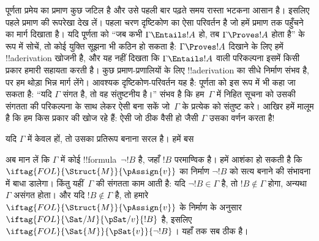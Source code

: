 \documentclass[../../../include/open-logic-section]{subfiles}
\begin{document}
      {}
      {}


पूर्णता प्रमेय का प्रमाण कुछ जटिल है और उसे पहली बार पढ़ते समय रास्ता भटकना
आसान है। इसलिए पहले प्रमाण की रूपरेखा देख लें। पहला चरण दृष्टिकोण का ऐसा
परिवर्तन है जो हमें प्रमाण तक पहुँचने का मार्ग दिखाता है। यदि पूर्णता को
``जब कभी $\Gamma
\Entails !A$ हो, तब $\Gamma \Proves !A$ होता है'' के रूप में सोचें, तो कोई
युक्ति सूझना भी कठिन हो सकता है: $\Gamma \Proves !A$ दिखाने के लिए हमें
!!a{derivation} खोजनी है, और यह नहीं दिखता कि $\Gamma \Entails !A$ वाली
परिकल्पना इसमें किसी प्रकार हमारी सहायता करती है। कुछ प्रमाण-प्रणालियों के
लिए !!a{derivation} का सीधे निर्माण संभव है, पर हम थोड़ा भिन्न मार्ग लेंगे।
आवश्यक दृष्टिकोण-परिवर्तन यह है: पूर्णता को इस रूप में भी कहा जा सकता है:
``यदि $\Gamma$ संगत है, तो वह संतुष्टनीय है।'' संभव है कि हम~$\Gamma$ में
निहित सूचना को उसकी संगतता की परिकल्पना के साथ लेकर ऐसी
 बना सकें जो~$\Gamma$ के प्रत्येक
 को संतुष्ट करे। आखिर हमें मालूम है कि
हम किस प्रकार की  खोज रहे हैं: ऐसी
जो ठीक वैसी हो जैसी $\Gamma$ उसका वर्णन करता है!{}

यदि $\Gamma$ में केवल  हों, तो उसका प्रतिरूप बनाना
सरल है। हमें बस

अब मान लें कि $\Gamma$ में कोई !!{formula}~$\lnot !B$ है, जहाँ $!B$
परमाण्विक है। हमें आशंका हो सकती है कि
$\iftag{FOL}{\Struct{M}}{\pAssign{v}}$ का निर्माण $\lnot !B$ को सत्य बनाने की
संभावना में बाधा डालेगा। किंतु यहीं~$\Gamma$ की संगतता काम आती है: यदि
$\lnot !B \in \Gamma$ है, तो $!B \notin
\Gamma$ होगा, अन्यथा $\Gamma$ असंगत होता। और यदि $!B \notin
\Gamma$ है, तो हमारे
$\iftag{FOL}{\Struct{M}}{\pAssign{v}}$ के निर्माण के अनुसार
$\iftag{FOL}{\Sat/{M}}{\pSat/{v}}{!B}$ है, इसलिए
$\iftag{FOL}{\Sat{M}}{\pSat{v}}{\lnot !B}$। यहाँ तक सब ठीक है।
\end{document}
